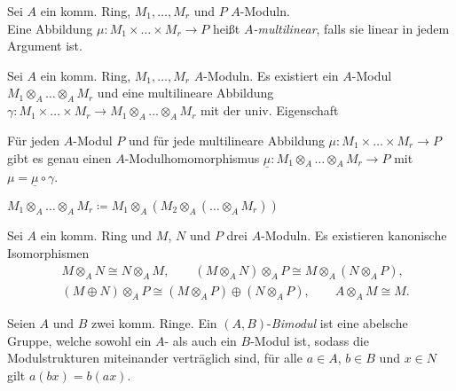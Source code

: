 \documentclass{cheat-sheet}
\begin{document}

\begin{defn}
  Sei $A$ ein komm. Ring, $M_1, \ldots, M_r$ und $P$ $A$-Moduln. \\
  Eine Abbildung $\mu : M_1 \times \ldots \times M_r \to P$ heißt \emph{$A$-multilinear}, falls sie linear in jedem Argument ist.
\end{defn}

\begin{prop}
  Sei $A$ ein komm. Ring, $M_1, \ldots, M_r$ $A$-Moduln.
  Es existiert ein $A$-Modul $M_1 \otimes_A \ldots \otimes_A M_r$ und eine multilineare Abbildung $\gamma : M_1 \times \ldots \times M_r \to M_1 \otimes_A \ldots \otimes_A M_r$ mit der univ. Eigenschaft

  \hfill\begin{minipage}{0.95 \linewidth}
    Für jeden $A$-Modul $P$ und für jede multilineare Abbildung $\mu : M_1 \times \ldots \times M_r \to P$ gibt es genau einen $A$-Modulhomomorphismus $\underline{\mu} : M_1 \otimes_A \ldots \otimes_A M_r \to P$ mit $\mu = \underline{\mu} \circ \gamma$.
  \end{minipage}
\end{prop}

\begin{konstr}
  $M_1 \otimes_A \ldots \otimes_A M_r \coloneqq M_1 \otimes_A (M_2 \otimes_A (\ldots \otimes_A M_r))$
\end{konstr}


\begin{prop}
  Sei $A$ ein komm. Ring und $M$, $N$ und $P$ drei $A$-Moduln.
  Es existieren kanonische Isomorphismen
  \begin{align*}
    & M \otimes_A N \cong N \otimes_A M, \qquad
    (M \otimes_A N) \otimes_A P \cong M \otimes_A (N \otimes_A P), \\
    & (M \oplus N) \otimes_A P \cong (M \otimes_A P) \oplus (N \otimes_A P), \qquad
    A \otimes_A M \cong M.
  \end{align*}
\end{prop}

\begin{defn}
  Seien $A$ und $B$ zwei komm. Ringe.
  Ein $(A, B)$-\emph{Bimodul} ist eine abelsche Gruppe, welche sowohl ein $A$- als auch ein $B$-Modul ist, sodass die Modulstrukturen miteinander verträglich sind, \dh{} für alle $a \in A$, $b \in B$ und $x \in N$ gilt $a (bx) = b (ax)$.
\end{defn}
\end{document}
